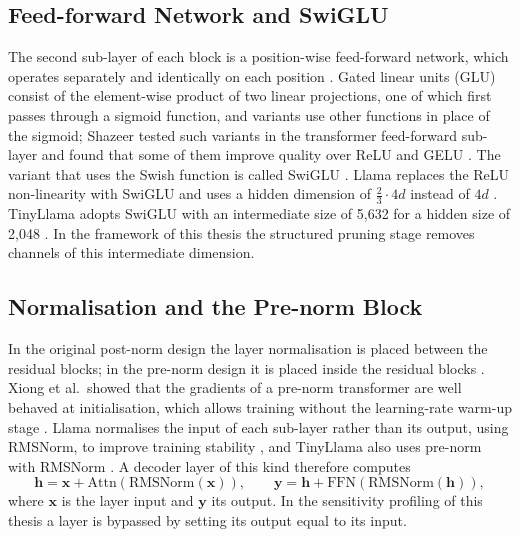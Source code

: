\subsection{Feed-forward Network and SwiGLU}
\label{sec:ch2-ffn}

The second sub-layer of each block is a position-wise feed-forward network, which operates separately and identically on each position \cite{lin2021survey}. Gated linear units (GLU) consist of the element-wise product of two linear projections, one of which first passes through a sigmoid function, and variants use other functions in place of the sigmoid; Shazeer tested such variants in the transformer feed-forward sub-layer and found that some of them improve quality over ReLU and GELU \cite{shazeer2020glu}. The variant that uses the Swish function is called SwiGLU \cite{shazeer2020glu}. Llama replaces the ReLU non-linearity with SwiGLU and uses a hidden dimension of $\frac{2}{3} \cdot 4d$ instead of $4d$ \cite{touvron2023llama}. TinyLlama adopts SwiGLU with an intermediate size of 5{,}632 for a hidden size of 2{,}048 \cite{zhang2024tinyllama}. In the framework of this thesis the structured pruning stage removes channels of this intermediate dimension.

\subsection{Normalisation and the Pre-norm Block}
\label{sec:ch2-norm}

In the original post-norm design the layer normalisation is placed between the residual blocks; in the pre-norm design it is placed inside the residual blocks \cite{xiong2020layernorm}. Xiong et al.\ showed that the gradients of a pre-norm transformer are well behaved at initialisation, which allows training without the learning-rate warm-up stage \cite{xiong2020layernorm}. Llama normalises the input of each sub-layer rather than its output, using RMSNorm, to improve training stability \cite{touvron2023llama}, and TinyLlama also uses pre-norm with RMSNorm \cite{zhang2024tinyllama}. A decoder layer of this kind therefore computes
\begin{equation}
  \mathbf{h} = \mathbf{x} + \mathrm{Attn}(\mathrm{RMSNorm}(\mathbf{x})), \qquad
  \mathbf{y} = \mathbf{h} + \mathrm{FFN}(\mathrm{RMSNorm}(\mathbf{h})),
  \label{eq:ch2-block}
\end{equation}
where $\mathbf{x}$ is the layer input and $\mathbf{y}$ its output. In the sensitivity profiling of this thesis a layer is bypassed by setting its output equal to its input.

